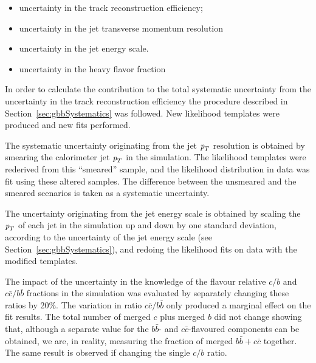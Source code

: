 \begin{itemize}\addtolength{\itemsep}{-0.4\baselineskip}
\item
uncertainty in the track reconstruction efficiency;
\item
uncertainty in the jet transverse momentum resolution 
\item
uncertainty in the jet energy scale.
\item
uncertainty in the heavy flavor fraction
\end{itemize}


In order to calculate the contribution to the total systematic uncertainty from the uncertainty in the track reconstruction efficiency the procedure described in Section~\ref{sec:gbbSystematics} was followed. New likelihood templates were produced and new fits performed. 

The systematic uncertainty originating from the jet  ${\emph{p}_{T}}$ resolution is obtained by smearing the calorimeter jet ${\emph{p}_{T}}$ in the simulation. The likelihood templates were rederived from this ``smeared'' sample, and the likelihood distribution in data was fit using these altered samples. The difference between the unsmeared and the smeared scenarios is taken as a systematic uncertainty. 

The uncertainty originating from the jet energy scale is obtained by scaling the ${\emph{p}_{T}}$ of each jet in the simulation up and down by one standard deviation, according to the uncertainty of the jet energy scale (see Section~\ref{sec:gbbSystematics}), and redoing the likelihood fits on data with the modified  %
templates.

The impact of the uncertainty in the knowledge of the flavour relative $c/b$ and $c\bar{c}/b\bar{b}$ fractions in the simulation was evaluated by separately changing these ratios by 20\%. The variation in ratio $c\bar{c}/b\bar{b}$ only produced a marginal effect on the fit results. The total number of merged $c$ plus merged $b$ did not change showing that, although a separate value for the $b\bar{b}$- and $c\bar{c}$-flavoured components can be obtained, we are,  in reality, measuring the fraction of merged $b\bar{b}+c\bar{c}$ together. The same result is observed if changing the single $c/b$ ratio.

